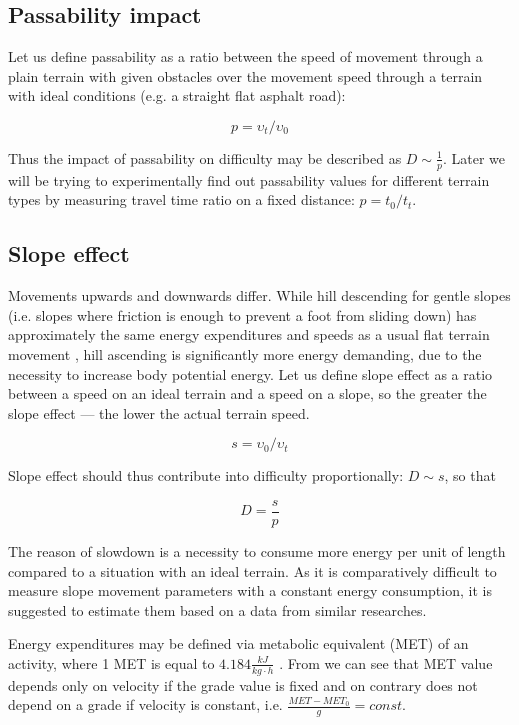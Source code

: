 \documentclass[12pt]{article}
\begin{document}
\subsection{Passability impact}
Let us define passability as a ratio between the speed of movement through a plain terrain with given obstacles over the movement speed through a terrain with ideal conditions (e.g. a straight flat asphalt road):

\begin{equation} \label{eq:p-definition}
p = \upsilon_{t}/\upsilon_{0}
\end{equation}

Thus the impact of passability on difficulty may be described as $D\sim\frac{1}{p}$. Later we will be trying to experimentally find out passability values for different terrain types by measuring travel time ratio on a fixed distance: $p=t_{0}/t_{t}$.


\subsection{Slope effect}
Movements upwards and downwards differ. While hill descending for gentle slopes (i.e. slopes where friction is enough to prevent a foot from sliding down) has approximately the same energy expenditures and speeds as a usual flat terrain movement \cite{mets-in-exercise}, hill ascending is significantly more energy demanding, due to the necessity to increase body potential energy. Let us define slope effect as a ratio between a speed on an ideal terrain and a speed on a slope, so the greater the slope effect --- the lower the actual terrain speed.

\begin{equation} \label{eq:s-definition}
s = \upsilon_{0}/\upsilon_{t}
\end{equation}

Slope effect should thus contribute into difficulty proportionally: $D\sim{s}$, so that

\begin{equation} \label{eq:diff-se}
D=\frac{s}{p}
\end{equation}

The reason of slowdown is a necessity to consume more energy per unit of length compared to a situation with an ideal terrain. As it is comparatively difficult to measure slope movement parameters with a constant energy consumption, it is suggested to estimate them based on a data from similar researches.

Energy expenditures may be defined via metabolic equivalent (MET) of an activity, where 1 MET is equal to $4.184\frac{kJ}{kg\cdot{h}}$ \cite{wiki-met}. From \cite{acsm-guidelines} we can see that MET value depends only on velocity if the grade value is fixed and on contrary does not depend on a grade if velocity is constant, i.e. $\frac{MET-MET_{0}}{g} = const$.
\end{document}
